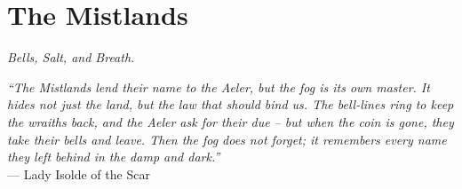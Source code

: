 \documentclass[12pt,oneside]{book}
\begin{document}


\newpage

\chapter{The Mistlands}
\emph{Bells, Salt, and Breath.}

\noindent
\textit{``The Mistlands lend their name to the Aeler, but the fog is its own master. It hides not just the land, but the law that should bind us. The bell-lines ring to keep the wraiths back, and the Aeler ask for their due -- but when the coin is gone, they take their bells and leave. Then the fog does not forget; it remembers every name they left behind in the damp and dark.''} \\
--- Lady Isolde of the Scar
\end{document}
